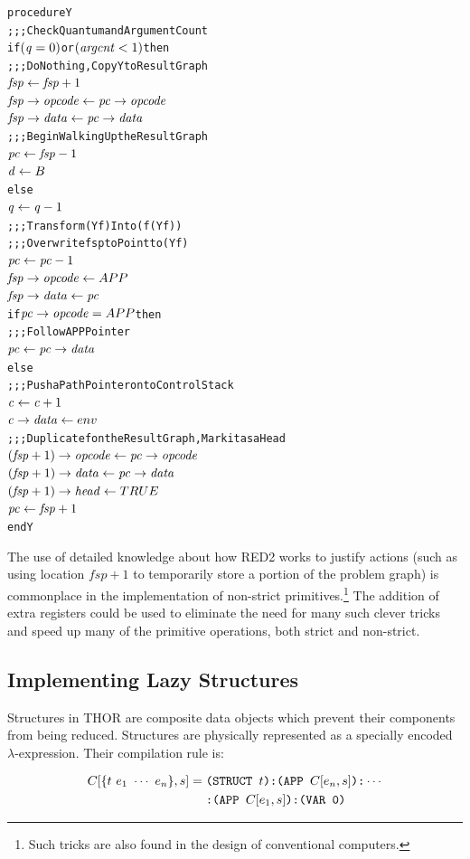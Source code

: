 \begin{alltt}
procedure Y
  ;;; Check Quantum and Argument Count
  if \((\rt{q} = 0)\) or \((\rt{argcnt} < 1)\) then
    ;;; Do Nothing, Copy Y to Result Graph
    \(\rt{fsp} \leftarrow \rt{fsp}+1\)
    \(\rtfield{fsp}{opcode} \leftarrow \rtfield{pc}{opcode}\)
    \(\rtfield{fsp}{data} \leftarrow \rtfield{pc}{data}\)
    ;;; Begin Walking Up the Result Graph
    \(\rt{pc} \leftarrow \rt{fsp}-1\)
    \(\rt{d} \leftarrow B\)
  else
    \(\rt{q} \leftarrow \rt{q}-1\)
    ;;; Transform (Y f) Into (f (Y f))
    ;;; Overwrite fsp to Point to (Y f)
    \(\rt{pc} \leftarrow \rt{pc}-1\)
    \(\rtfield{fsp}{opcode} \leftarrow APP\)
    \(\rtfield{fsp}{data} \leftarrow \rt{pc}\)
    if \(\rtfield{pc}{opcode} = APP\) then
      ;;; Follow APP Pointer
      \(\rt{pc} \leftarrow \rtfield{pc}{data}\)
    else
      ;;; Push a Path Pointer onto Control Stack
      \(\rt{c} \leftarrow \rt{c}+1\)
      \(\rtfield{c}{data} \leftarrow env\)
      ;;; Duplicate f on the Result Graph, Mark it as a Head
      \((\rt{fsp}+1)\rightarrow\mathit{opcode} \leftarrow \rtfield{pc}{opcode}\)
      \((\rt{fsp}+1)\rightarrow\mathit{data} \leftarrow \rtfield{pc}{data}\)
      \((\rt{fsp}+1)\rightarrow\mathit{head} \leftarrow TRUE\)
      \(\rt{pc} \leftarrow \rt{fsp}+1\)
end Y
\end{alltt}

The use of detailed knowledge about how RED2 works to justify actions (such as using
location \(fsp+1\) to temporarily store a portion of the problem graph) is commonplace in
the implementation of non-strict primitives.\footnote{Such tricks are also found in the
design of conventional computers.} The addition of extra registers could be used to
eliminate the need for many such clever tricks and speed up many of the primitive
operations, both strict and non-strict.


\subsection{Implementing Lazy Structures}

Structures in THOR are composite data objects which prevent their components from being
reduced. Structures are physically represented as a specially encoded \(\lambda\)-expression.
Their compilation rule is:

\[
\begin{aligned}
C[\{t\ e_1\ \cdots\ e_n\}, s] ={}&
  \texttt{(STRUCT }t\texttt{):(APP }C[e_n,s]\texttt{):}\cdots\\
&\texttt{:(APP }C[e_1,s]\texttt{):(VAR 0)}
\end{aligned}
\]


